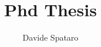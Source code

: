 \documentclass{report}
\begin{document}
\title{Phd Thesis}
\author{Davide Spataro}

\maketitle


\pagestyle{plain}


\tableofcontents



%




%




\end{document}
